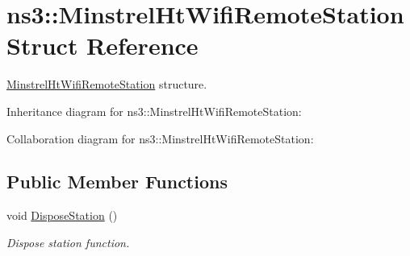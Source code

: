 \hypertarget{structns3_1_1MinstrelHtWifiRemoteStation}{}\section{ns3\+:\+:Minstrel\+Ht\+Wifi\+Remote\+Station Struct Reference}
\label{structns3_1_1MinstrelHtWifiRemoteStation}


\hyperlink{structns3_1_1MinstrelHtWifiRemoteStation}{Minstrel\+Ht\+Wifi\+Remote\+Station} structure.  




Inheritance diagram for ns3\+:\+:Minstrel\+Ht\+Wifi\+Remote\+Station\+:


Collaboration diagram for ns3\+:\+:Minstrel\+Ht\+Wifi\+Remote\+Station\+:
\subsection*{Public Member Functions}
\begin{DoxyCompactItemize}
\item 
void \hyperlink{structns3_1_1MinstrelHtWifiRemoteStation_a775687f2fd91e505f4389866c64b474b}{Dispose\+Station} ()
\begin{DoxyCompactList}\small\item\em Dispose station function. \end{DoxyCompactList}\end{DoxyCompactItemize}
